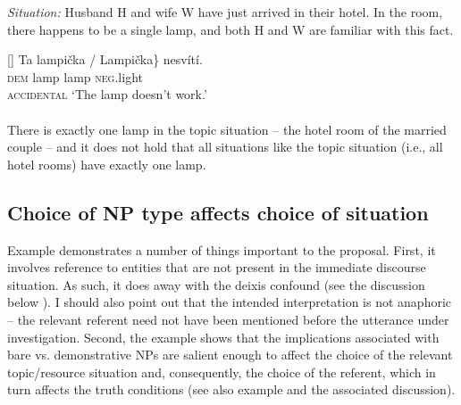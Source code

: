 \documentclass[output=paper,colorlinks,citecolor=brown,newtxmath]{langscibook}
\begin{document}
\ea \textit{Situation:} Husband H and wife W have just arrived in their hotel. In the room, there happens to be a single lamp, and both H and W are familiar with this fact.\label{simik:ex:lamp2}
\begin{xlist}
[]{\gll \minsp{\{} Ta lampička / \minsp{\#} Lampička\} nesvítí.\\
{} \textsc{dem} lamp {} {} lamp \textsc{neg.}light\\\hfill\textsc{accidental}
\glt `The lamp doesn't work.'\\\smallskip
{}\smallskip\\
There is exactly one lamp in the topic situation -- the hotel room of the married couple -- and it does not hold that all situations like the topic situation (i.e., all hotel rooms) have exactly one lamp.}
\end{xlist}
\z

\subsection{Choice of NP type affects choice of situation}\label{simik:sec:np-choice}

Example  demonstrates a number of things important to the proposal. First, it involves reference to entities that are not present in the immediate discourse situation. As such, it does away with the deixis confound (see the discussion below ). I should also point out that the intended interpretation is not anaphoric -- the relevant referent need not have been mentioned before the utterance under investigation. Second, the example shows that the implications associated with bare vs. demonstrative NPs are salient enough to affect the choice of the relevant topic/resource situation and, consequently, the choice of the referent, which in turn affects the truth conditions (see also example  and the associated discussion).
\end{document}
